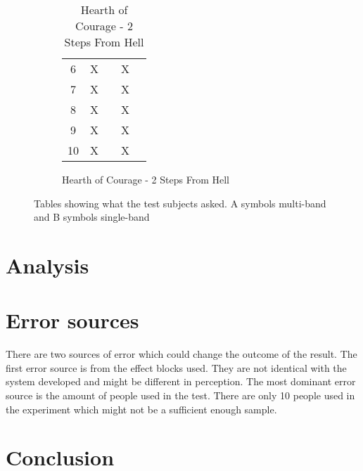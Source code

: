 \begin{figure}[H]
\begin{subfigure}[t]{0.45\textwidth}
\begin{table}[H]
\begin{tabular}{ccccc}
6          & X         &           & X         &          \\
7          & X         &           & X         &          \\
8          & X         &           & X         &          \\
9          & X         &           & X         &          \\
10         & X         &           & X         &          \\ \bottomrule
\end{tabular}
\caption{Hearth of Courage - 2 Steps From Hell}
\label{tab:HearthofCourage}
\end{table}
\end{subfigure}

\caption{Tables showing what the test subjects asked. A symbols multi-band and B symbols single-band}
\label{tab:combinedanswers}
\end{figure}  


\section{Analysis}



\section{Error sources}

There are two sources of error which could change the outcome of the result. The first error source is from the effect blocks used. They are not identical with the system developed and might be different in perception. The most dominant error source is the amount of people used in the test. There are only 10 people used in the experiment which might not be a sufficient enough sample.

\section{Conclusion}





